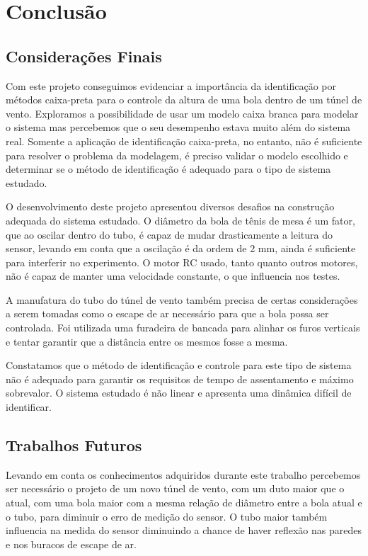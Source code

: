 \chapter{Conclusão} \label{cap7}

\section{Considerações Finais}
Com este projeto conseguimos evidenciar a importância da identificação por métodos caixa-preta para o controle da altura de uma bola dentro de um túnel de vento. Exploramos a possibilidade de usar um modelo caixa branca para modelar o sistema mas percebemos que o seu desempenho estava muito além do sistema real. Somente a aplicação de identificação caixa-preta, no entanto, não é suficiente para resolver o problema da modelagem, é preciso validar o modelo escolhido e determinar se o método de identificação é adequado para o tipo de sistema estudado.


O desenvolvimento deste projeto apresentou diversos desafios na construção adequada do sistema estudado. O diâmetro da bola de tênis de mesa é um fator, que ao oscilar dentro do tubo, é capaz de mudar drasticamente a leitura do sensor, levando em conta que a oscilação é da ordem de 2 mm, ainda é suficiente para interferir no experimento. O motor RC usado, tanto quanto outros motores, não é capaz de manter uma velocidade constante, o que influencia nos testes.


A manufatura do tubo do túnel de vento também precisa de certas considerações a serem tomadas como o escape de ar necessário para que a bola possa ser controlada. Foi utilizada uma furadeira de bancada para alinhar os furos verticais e tentar garantir que a distância entre os mesmos fosse a mesma.


Constatamos que o método de identificação e controle para este tipo de sistema não é adequado para garantir os requisitos de tempo de assentamento e máximo sobrevalor. O sistema estudado é não linear e apresenta uma dinâmica difícil de identificar.




\section{Trabalhos Futuros}
Levando em conta os conhecimentos adquiridos durante este trabalho percebemos ser necessário o projeto de um novo túnel de vento, com um duto maior que o atual, com uma bola maior com a mesma relação de diâmetro entre a bola atual e o tubo, para diminuir o erro de medição do sensor. O tubo maior também influencia na medida do sensor diminuindo a chance de haver reflexão nas paredes e nos buracos de escape de ar. 




